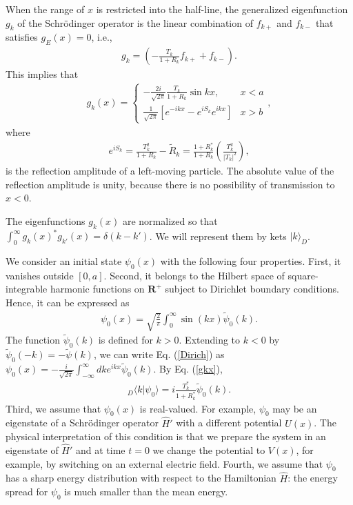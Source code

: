 \documentclass[12pt]{article}
\numberwithin{equation}{section}
\begin{document}
When the range of $x$ is restricted into the half-line, the generalized eigenfunction $g_k$ of the Schr\"odinger operator   is the linear combination of $f_{k+}$ and $f_{k-}$ that satisfies  $g_E(x) = 0$, i.e.,
\begin{eqnarray}
g_k =  \left( -\frac{T_k}{1+R_k} f_{k+} + f_{k-}\right).
\end{eqnarray}
This implies that
\begin{eqnarray}
g_{k}(x) = \left\{ \begin{array}{cc} -\frac{2i}{\sqrt{2\pi}} \frac{T_k}{1+R_k} \sin kx, & x < a\\
 \frac{1}{\sqrt{2\pi}} \left[ e^{- ikx} - e^{iS_k} e^{ikx} \right] & x > b
 \end{array}\right. , \label{gkx}
\end{eqnarray}
where
\begin{eqnarray}
e^{i S_k} = \frac{T_k^2}{1+R_k} - \tilde{R}_k =  \frac{1+R^*_k}{1+R_k} \left(\frac{T_k^2}{|T_k|^2}\right), \label{eithe}
\end{eqnarray}
is the reflection amplitude of a left-moving particle. The absolute value of the reflection amplitude is unity, because there is no possibility of transmission to $x < 0$.

The eigenfunctions $g_k(x)$ are normalized so that $\int_0^{\infty} g_k(x)^* g_{k'}(x) = \delta(k-k')$. We will represent them by kets $|k\rangle_D$.

\medskip

 We consider an initial state $\psi_0(x)$ with the following four properties. First, it vanishes  outside $[0, a]$. Second, it belongs to the Hilbert space of square-integrable harmonic functions on ${\pmb R}^+$ subject to Dirichlet boundary conditions. Hence, it can be expressed as
\begin{eqnarray}
\psi_0(x) = \sqrt{\frac{2}{\pi}} \int_0^{\infty} \sin(kx) \tilde{\psi}_0(k). \label{Dirich}
\end{eqnarray}
The function $\tilde{\psi}_0(k)$ is defined for $k > 0$. Extending to $k <0$ by $\tilde{\psi}_0(-k) = -\tilde{\psi}(k)$, we can write Eq. (\ref{Dirich}) as $\psi_0(x) = - \frac{i}{\sqrt{2\pi}} \int_{-\infty}^{\infty} dk e^{ikx} \tilde{\psi}_0(k)$. By Eq. (\ref{gkx}),
\begin{eqnarray}
{}_D\langle k|\psi_0\rangle = i \frac{T^*_k}{1+R^*_k}   \tilde{\psi}_0(k).
\end{eqnarray}
Third, we assume that $\psi_0(x)$ is real-valued. For example, $\psi_0$ may be an eigenstate of a  Schr\"odinger operator $\hat{H}'$ with a different potential $U(x)$.  The physical interpretation of this condition is that we prepare the system in an eigenstate of $\hat{H}'$ and at time $t = 0$ we change the potential to $V(x)$, for example, by switching on an external electric field. Fourth,  we assume that   $\psi_0$  has a sharp energy distribution with respect to the Hamiltonian $\hat{H}$: the energy spread for $\psi_0$ is much smaller than the mean energy.
\end{document}
